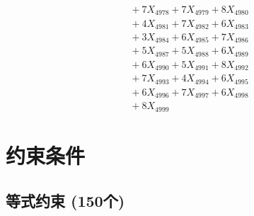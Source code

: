 \documentclass[a4paper,10pt]{article}
\begin{document}
{\begin{align}
&\;  + 7 X_{4978} + 7 X_{4979} + 8 X_{4980} \\[0.3ex]
&\;  + 4 X_{4981} + 7 X_{4982} + 6 X_{4983} \\[0.3ex]
&\;  + 3 X_{4984} + 6 X_{4985} + 7 X_{4986} \\[0.3ex]
&\;  + 5 X_{4987} + 5 X_{4988} + 6 X_{4989} \\[0.5ex]\allowbreak
&\;  + 6 X_{4990} + 5 X_{4991} + 8 X_{4992} \\[0.3ex]
&\;  + 7 X_{4993} + 4 X_{4994} + 6 X_{4995} \\[0.3ex]
&\;  + 6 X_{4996} + 7 X_{4997} + 6 X_{4998} \\[0.3ex]
&\;  + 8 X_{4999}\nonumber
\end{align}
}

\section{约束条件}

\subsection{等式约束 (150个)}
\end{document}
